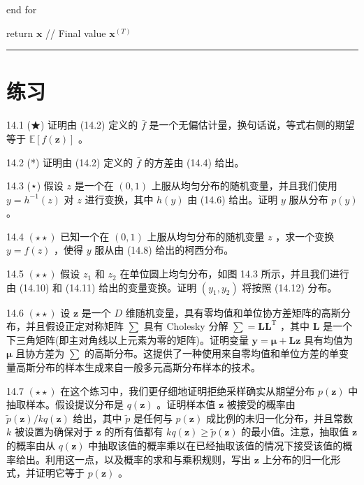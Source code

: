 \documentclass[10pt]{article}
\newcommand{\HRule}{\begin{center}\rule{0.9\linewidth}{0.2mm}\end{center}}
\begin{document}
end for

return \(\mathbf{x}\) // Final value \({\mathbf{x}}^{\left( T\right) }\)

\HRule

\section*{练习}

14.1 (★) 证明由 (14.2) 定义的 \(\bar{f}\) 是一个无偏估计量，换句话说，等式右侧的期望等于 \(\mathbb{E}\left\lbrack  {f\left( \mathbf{z}\right) }\right\rbrack\) 。

14.2 (*) 证明由 (14.2) 定义的 \(\bar{f}\) 的方差由 (14.4) 给出。

14.3 (⋆) 假设 \(z\) 是一个在 \(\left( {0,1}\right)\) 上服从均匀分布的随机变量，并且我们使用 \(y = {h}^{-1}\left( z\right)\) 对 \(z\) 进行变换，其中 \(h\left( y\right)\) 由 (14.6) 给出。证明 \(y\) 服从分布 \(p\left( y\right)\) 。

14.4 \(\left( {\star  \star  }\right)\) 已知一个在 \(\left( {0,1}\right)\) 上服从均匀分布的随机变量 \(z\) ，求一个变换 \(y = f\left( z\right)\) ，使得 \(y\) 服从由 (14.8) 给出的柯西分布。

14.5 \(\left( {\star  \star  }\right)\) 假设 \({z}_{1}\) 和 \({z}_{2}\) 在单位圆上均匀分布，如图 14.3 所示，并且我们进行由 (14.10) 和 (14.11) 给出的变量变换。证明 \(\left( {{y}_{1},{y}_{2}}\right)\) 将按照 (14.12) 分布。

14.6 \(\left( {\star  \star  }\right)\) 设 \(\mathbf{z}\) 是一个 \(D\) 维随机变量，具有零均值和单位协方差矩阵的高斯分布，并且假设正定对称矩阵 \(\mathbf{\sum }\) 具有 Cholesky 分解 \(\mathbf{\sum } = \mathbf{L}{\mathbf{L}}^{\mathrm{T}}\) ，其中 \(\mathbf{L}\) 是一个下三角矩阵(即主对角线以上元素为零的矩阵)。证明变量 \(\mathbf{y} = \mathbf{\mu } + \mathbf{L}\mathbf{z}\) 具有均值为 \(\mathbf{\mu }\) 且协方差为 \(\mathbf{\sum }\) 的高斯分布。这提供了一种使用来自零均值和单位方差的单变量高斯分布的样本生成来自一般多元高斯分布样本的技术。

14.7 \(\left( {\star  \star  }\right)\) 在这个练习中，我们更仔细地证明拒绝采样确实从期望分布 \(p\left( \mathbf{z}\right)\) 中抽取样本。假设提议分布是 \(q\left( \mathbf{z}\right)\) 。证明样本值 \(\mathbf{z}\) 被接受的概率由 \(\widetilde{p}\left( \mathbf{z}\right) /{kq}\left( \mathbf{z}\right)\) 给出，其中 \(\widetilde{p}\) 是任何与 \(p\left( \mathbf{z}\right)\) 成比例的未归一化分布，并且常数 \(k\) 被设置为确保对于 \(\mathbf{z}\) 的所有值都有 \({kq}\left( \mathbf{z}\right)  \geq  \widetilde{p}\left( \mathbf{z}\right)\) 的最小值。注意，抽取值 \(\mathbf{z}\) 的概率由从 \(q\left( \mathbf{z}\right)\) 中抽取该值的概率乘以在已经抽取该值的情况下接受该值的概率给出。利用这一点，以及概率的求和与乘积规则，写出 \(\mathbf{z}\) 上分布的归一化形式，并证明它等于 \(p\left( \mathbf{z}\right)\) 。
\end{document}
